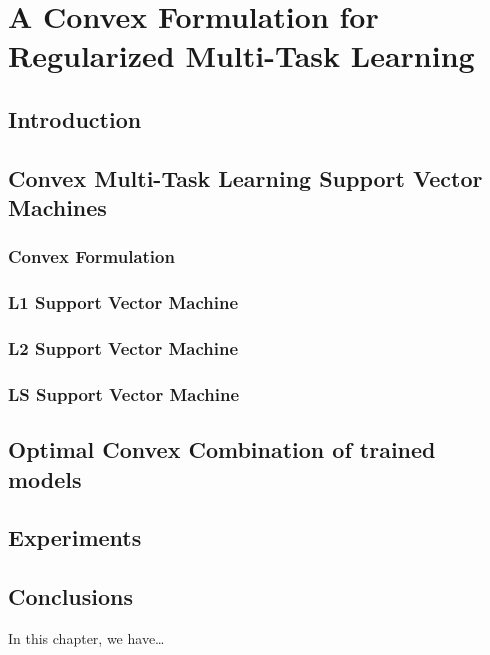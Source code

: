 
\chapter{A Convex Formulation for Regularized Multi-Task Learning} %
\label{Chapter3}

{\bf \small{

}}

\section{Introduction}

\section{Convex Multi-Task Learning Support Vector Machines}
\subsection{Convex Formulation}
\subsection{L1 Support Vector Machine}
\subsection{L2 Support Vector Machine}
\subsection{LS Support Vector Machine}

\section{Optimal Convex Combination of trained models}

\section{Experiments}

\section{Conclusions}\label{sec-conclusions-3}

In this chapter, we have\dots
